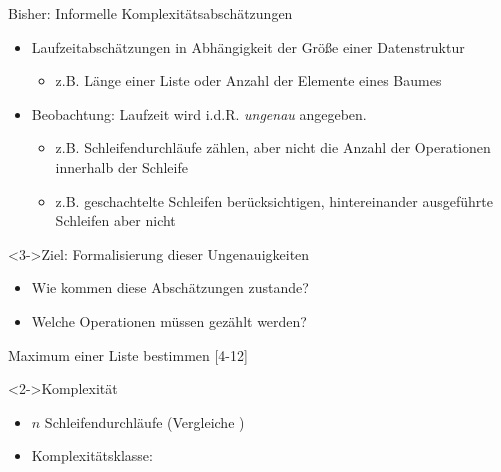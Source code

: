 \begin{frame}
    \begin{block}{Bisher: Informelle Komplexitätsabschätzungen}
        \begin{itemize}
            \item Laufzeitabschätzungen in Abhängigkeit der Größe einer Datenstruktur
            \begin{itemize}
                \item z.B. Länge einer Liste oder Anzahl der Elemente eines Baumes
            \end{itemize}
            \item<2-> Beobachtung: Laufzeit wird i.d.R. \emph{ungenau} angegeben.
            \begin{itemize}
                \item z.B. Schleifendurchläufe zählen, aber nicht die Anzahl der Operationen innerhalb der Schleife
                \item z.B. geschachtelte Schleifen berücksichtigen, hintereinander ausgeführte Schleifen aber nicht
            \end{itemize}
        \end{itemize}
    \end{block}

    \begin{block}<3->{Ziel: Formalisierung dieser Ungenauigkeiten}
        \begin{itemize}
            \item Wie kommen diese Abschätzungen zustande?
            \item Welche Operationen müssen gezählt werden?
        \end{itemize}
    \end{block}
\end{frame}

\begin{frame}
    \begin{exblock}{Maximum einer Liste bestimmen}
        [4-12]
    \end{exblock}
    \begin{block}<2->{Komplexität}
        \begin{itemize}
            \item $n$ Schleifendurchläufe (Vergleiche )
            \item Komplexitätsklasse: \olin
        \end{itemize}
    \end{block}
\end{frame}

